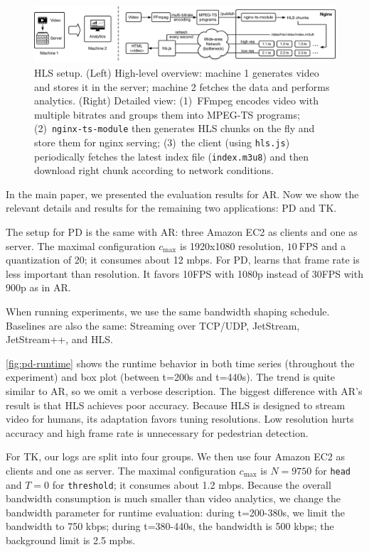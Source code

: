 \documentclass[twocolumn, 9pt]{article}
\begin{document}
\begin{figure}[!htb]
  \centering
  \includegraphics[width=\textwidth]{figures/hls-arch.pdf}
  \caption{HLS setup. (Left) High-level overview: machine 1 generates video and
    stores it in the server; machine 2 fetches the data and performs
    analytics. (Right) Detailed view: (1)~FFmpeg encodes video with multiple
    bitrates and groups them into MPEG-TS programs; (2)~\texttt{nginx-ts-module}
    then generates HLS chunks on the fly and store them for nginx serving;
    (3)~the client (using \texttt{hls.js}) periodically fetches the latest index
    file (\texttt{index.m3u8}) and then download right chunk according to
    network conditions.}
  \label{fig:hls-arch}
\end{figure}

In the main paper, we presented the evaluation results for AR. Now we show the
relevant details and results for the remaining two applications: PD and TK.

 The setup for PD is the same with AR: three Amazon
EC2 as clients and one as server. The maximal configuration $c_{\max}$ is
1920x1080 resolution, \(10~\text{FPS}\) and a quantization of 20; it consumes
about 12 mbps. For PD, \sysname{} learns that frame rate is less important than
resolution. It favors 10FPS with 1080p instead of 30FPS with 900p as in AR.

When running experiments, we use the same bandwidth shaping schedule. Baselines
are also the same: Streaming over TCP/UDP, JetStream, JetStream++, and HLS.

\autoref{fig:pd-runtime} shows the runtime behavior in both time series
(throughout the experiment) and box plot (between t=200s and t=440s). The trend
is quite similar to AR, so we omit a verbose description. The biggest difference
with AR's result is that HLS achieves poor accuracy. Because HLS is designed to
stream video for humans, its adaptation favors tuning resolutions. Low
resolution hurts accuracy and high frame rate is unnecessary for pedestrian
detection.

 For TK, our logs are split into four groups. We then use four
Amazon EC2 as clients and one as server. The maximal configuration $c_{\max}$ is
$N=9750$ for \texttt{head} and $T=0$ for \texttt{threshold}; it consumes about
1.2 mbps. Because the overall bandwidth consumption is much smaller than video
analytics, we change the bandwidth parameter for runtime evaluation: during
t=200-380s, we limit the bandwidth to 750 kbps; during t=380-440s, the bandwidth
is 500 kbps; the background limit is 2.5 mpbs.
\end{document}
